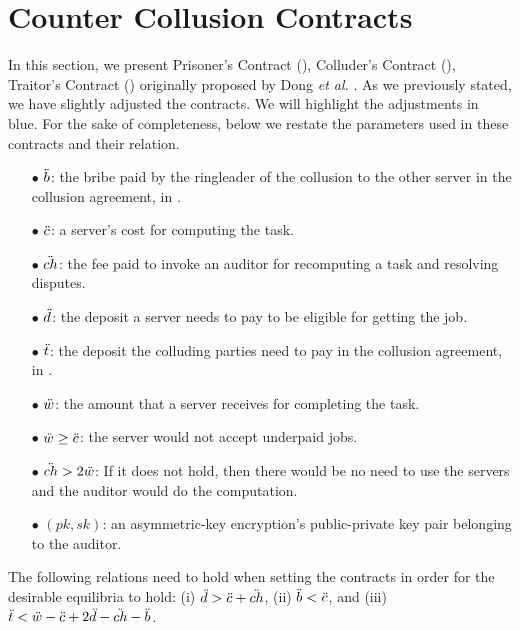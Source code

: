 

\section{Counter Collusion Contracts}\label{appendix::Counter-Collusion-Contracts}

In this section, we present Prisoner’s Contract (\SCpc), Colluder’s Contract (\SCcc), Traitor’s Contract (\SCtc) originally proposed by Dong \textit{et al.} \cite{dong2017betrayal}. As we previously stated, we have slightly adjusted the contracts.  We will highlight the adjustments in blue. For the sake of completeness, below we restate the parameters used in these contracts and their relation. 


\begin{itemize}
\item[$\bullet$] $\ddot{b}$: the bribe paid by the ringleader of the collusion to the other
server in the collusion agreement, in \SCcc.
%
\item[$\bullet$] $\ddot{c}$: a server’s cost for computing the task.
%
\item[$\bullet$] $\ddot{ch}$: the fee paid to invoke an auditor for recomputing a task and resolving
disputes.
%
\item[$\bullet$] $\ddot{d}$: the deposit a server needs to pay to be eligible for getting the job.
%
\item[$\bullet$] $\ddot{t}$: the deposit the colluding parties need to pay in the collusion agreement, in \SCcc.
%
\item[$\bullet$] $\ddot{w}$: the amount that a server receives for completing the task.
%
\item[$\bullet$] $\ddot{w} \geq \ddot{c}$: the server would not accept underpaid jobs.
%
\item[$\bullet$] $\ddot{ch} > 2\ddot{w}$: If it does not hold, then there would be no need to use the servers and the auditor would do the computation.
%
\item [$\bullet$] $(pk,sk)$: an asymmetric-key encryption's public-private key pair belonging to the auditor. 
\end{itemize}
\noindent The following relations need to hold when setting the contracts
in order for the desirable equilibria to hold:
%
(i) $\ddot{d}>\ddot{c}+\ddot{ch}$, (ii) $\ddot{b}<\ddot{c}$, and (iii) $\ddot{t}<\ddot{w}-\ddot{c} + 2\ddot{d} - \ddot{ch} -\ddot{b}$.











